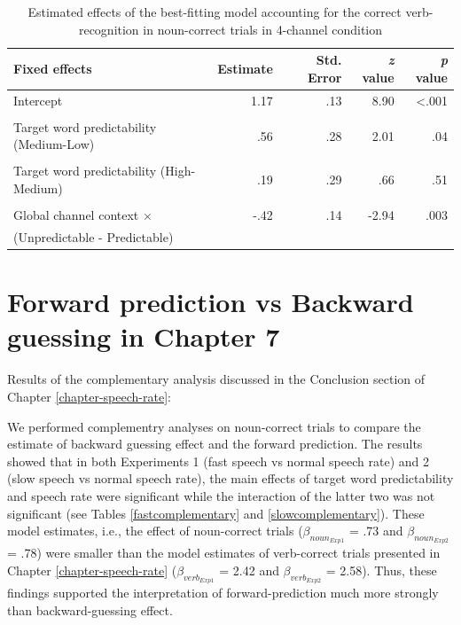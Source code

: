 \documentclass[a4paper, nobind]{templates/ociamthesis}
\begin{document}
\begin{table}[h]
\begin{center}
\caption{Estimated effects of the best-fitting model accounting for the correct verb-recognition in noun-correct trials in 4-channel condition}
\label{gradedcomplementary2} 
\vskip 0.12in
\begin{tabular}[]{@{}lrrrr@{}}
\toprule
Fixed effects & Estimate & Std. Error & \emph{z} value & \emph{p}
value \\
\midrule
Intercept & 1.17 & .13 & 8.90 & \textless.001 \\
\\
Target word predictability (Medium-Low) & .56 & .28 & 2.01 & .04 \\
\\
Target word predictability (High-Medium) & .19 & .29 & .66 & .51 \\
\\
Global channel context $\times$ & -.42 & .14 & -2.94 & .003 \\
(Unpredictable - Predictable) \\
\bottomrule
\end{tabular} 
\end{center} 
\end{table}

\hypertarget{appendix-C}{%
\chapter{Forward prediction vs Backward guessing in Chapter 7}\label{appendix-C}}

Results of the complementary analysis discussed in the Conclusion section of Chapter \ref{chapter-speech-rate}:

We performed complementry analyses on noun-correct trials to compare the estimate of backward guessing effect and the forward prediction.
The results showed that in both Experiments 1 (fast speech vs normal speech rate) and 2 (slow speech vs normal speech rate),
the main effects of target word predictability and speech rate were significant while the interaction of the latter two was not significant (see Tables \ref{fastcomplementary} and \ref{slowcomplementary}).
These model estimates, i.e., the effect of noun-correct trials (\(\beta_{{noun}_{Exp1}}\) = .73 and \(\beta_{{noun}_{Exp2}}\) = .78) were smaller than the model estimates of verb-correct trials presented in Chapter \ref{chapter-speech-rate} (\(\beta_{{verb}_{Exp1}}\) = 2.42 and \(\beta_{{verb}_{Exp2}}\) = 2.58).
Thus, these findings supported the interpretation of forward-prediction much more strongly than backward-guessing effect.
\end{document}
